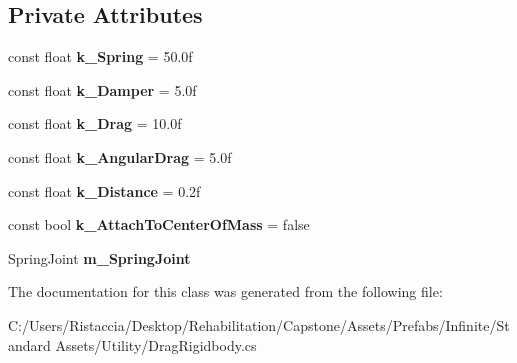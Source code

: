 \subsection*{Private Attributes}
\begin{DoxyCompactItemize}
\item 
\mbox{\label{class_unity_standard_assets_1_1_utility_1_1_drag_rigidbody_a8a949c76f71ef2c7cb6f5bec9d237e80}} 
const float {\bfseries k\+\_\+\+Spring} = 50.\+0f
\item 
\mbox{\label{class_unity_standard_assets_1_1_utility_1_1_drag_rigidbody_ad7dd56061be26b11d851fadb5b7d80b2}} 
const float {\bfseries k\+\_\+\+Damper} = 5.\+0f
\item 
\mbox{\label{class_unity_standard_assets_1_1_utility_1_1_drag_rigidbody_a8cf45ce006cae475930e2e1df9824bab}} 
const float {\bfseries k\+\_\+\+Drag} = 10.\+0f
\item 
\mbox{\label{class_unity_standard_assets_1_1_utility_1_1_drag_rigidbody_adea45dfc89287a6614dcbd40046dc164}} 
const float {\bfseries k\+\_\+\+Angular\+Drag} = 5.\+0f
\item 
\mbox{\label{class_unity_standard_assets_1_1_utility_1_1_drag_rigidbody_a5781a7d97544baf9d8c8432f7601dd67}} 
const float {\bfseries k\+\_\+\+Distance} = 0.\+2f
\item 
\mbox{\label{class_unity_standard_assets_1_1_utility_1_1_drag_rigidbody_a62dbadb1a609be018045064c14889321}} 
const bool {\bfseries k\+\_\+\+Attach\+To\+Center\+Of\+Mass} = false
\item 
\mbox{\label{class_unity_standard_assets_1_1_utility_1_1_drag_rigidbody_a518c7aaa8bc85e294b40250bd67a8a2e}} 
Spring\+Joint {\bfseries m\+\_\+\+Spring\+Joint}
\end{DoxyCompactItemize}


The documentation for this class was generated from the following file\+:\begin{DoxyCompactItemize}
\item 
C\+:/\+Users/\+Ristaccia/\+Desktop/\+Rehabilitation/\+Capstone/\+Assets/\+Prefabs/\+Infinite/\+Standard Assets/\+Utility/Drag\+Rigidbody.\+cs\end{DoxyCompactItemize}
